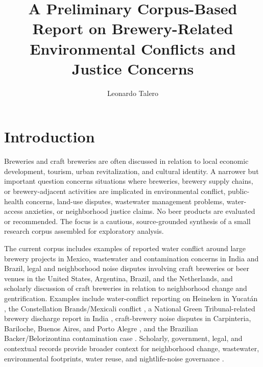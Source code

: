 \documentclass[man,12pt]{apa7}
\title{A Preliminary Corpus-Based Report on Brewery-Related Environmental Conflicts and Justice Concerns}
\author{Leonardo Talero}
\affiliation{Independent preliminary desk review}
\begin{document}
\maketitle

\section{Introduction}

Breweries and craft breweries are often discussed in relation to local economic development, tourism, urban revitalization, and cultural identity. A narrower but important question concerns situations where breweries, brewery supply chains, or brewery-adjacent activities are implicated in environmental conflict, public-health concerns, land-use disputes, wastewater management problems, water-access anxieties, or neighborhood justice claims. No beer products are evaluated or recommended. The focus is a cautious, source-grounded synthesis of a small research corpus assembled for exploratory analysis.

The current corpus includes examples of reported water conflict around large brewery projects in Mexico, wastewater and contamination concerns in India and Brazil, legal and neighborhood noise disputes involving craft breweries or beer venues in the United States, Argentina, Brazil, and the Netherlands, and scholarly discussion of craft breweries in relation to neighborhood change and gentrification. Examples include water-conflict reporting on Heineken in Yucat\'an \cite{NEWS_2025_MX_heineken-yucatan-water_N001}, the Constellation Brands/Mexicali conflict \cite{NEWS_2019_MX_constellation-mexicali-water_N005,ARTICLE_2021_MX_resistencias-cervecera-mexicali_A004}, a National Green Tribunal-related brewery discharge report in India \cite{NEWS_2025_IN_chhatarpur-toxic-discharge_N002}, craft-brewery noise disputes in Carpinteria, Bariloche, Buenos Aires, and Porto Alegre \cite{NEWS_2025_US_island-brewing-noise_N003,NEWS_2024_AR_ogham-bariloche-noise_N006,NEWS_2017_AR_boom-cervecerias-ruidos_N007,NEWS_2022_BR_delta-porto-alegre-noise_N008}, and the Brazilian Backer/Belorizontina contamination case \cite{NEWS_2020_BR_belorizontina-contaminacao_N009}. Scholarly, government, legal, and contextual records provide broader context for neighborhood change, wastewater, environmental footprints, water reuse, and nightlife-noise governance \cite{ARTICLE_2017_US_neighborhood-change-pint_A001,ARTICLE_2018_US_craft-breweries-local-characteristics_A002,ARTICLE_2026_GLOBAL_small-breweries-footprints_A003,REPORT_2020_US_brewery-pollution-prevention_R001,REPORT_2020_US_brewery-wastewater-bmps_R002,REPORT_2024_FR_microbrasseries-eau-effluents_R003,REPORT_2023_FR_biere-impact-eau_R004,LEGAL_2021_NL_biercafe-geluidsoverlast_L001,REPORT_2024_BE_vlarem-microbrouwerijen-afvalwater_R005,NEWS_2026_DE_bier-aus-klaeranlage_N011,REPORT_2019_IT_effluenti-industria-birra_R006,REPORT_2025_IT_molestia-movida-rumore_R007}.
\end{document}
